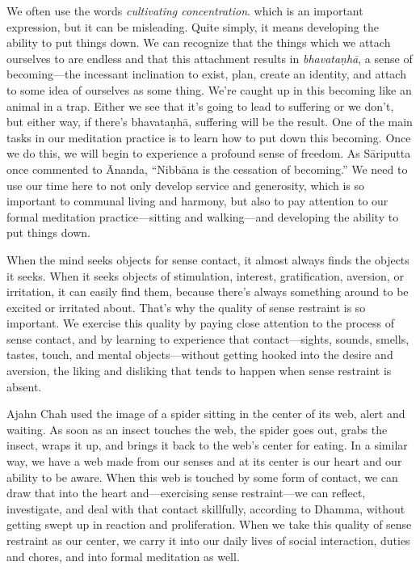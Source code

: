 We often use the words \emph{cultivating concentration}. which is an 
important expression, but it can be misleading. Quite simply, it means 
developing the ability to put things down. We can recognize that the 
things which we attach ourselves to are endless and that this 
attachment results in \emph{bhavataṇhā}, a sense of becoming---the 
incessant inclination to exist, plan, create an identity, and attach to 
some idea of ourselves as some thing. We're caught up in this becoming 
like an animal in a trap. Either we see that it's going to lead to 
suffering or we don't, but either way, if there's bhavataṇhā, 
suffering will be the result. One of the main tasks in our meditation 
practice is to learn how to put down this becoming. Once we do this, we 
will begin to experience a profound sense of freedom. As Sāriputta 
once commented to Ānanda, ``Nibbāna is the cessation of becoming.'' 
We need to use our time here to not only develop service and 
generosity, which is so important to communal living and harmony, but 
also to pay attention to our formal meditation practice---sitting and 
walking---and developing the ability to put things down.


When the mind seeks objects for sense contact, it almost always finds 
the objects it seeks. When it seeks objects of stimulation, interest, 
gratification, aversion, or irritation, it can easily find them, 
because there's always something around to be excited or irritated 
about. That's why the quality of sense restraint is so important. We 
exercise this quality by paying close attention to the process of sense 
contact, and by learning to experience that contact---sights, sounds, 
smells, tastes, touch, and mental objects---without getting hooked into 
the desire and aversion, the liking and disliking that tends to happen 
when sense restraint is absent.

Ajahn Chah used the image of a spider sitting in the center of its web, 
alert and waiting. As soon as an insect touches the web, the spider 
goes out, grabs the insect, wraps it up, and brings it back to the 
web's center for eating. In a similar way, we have a web made from our 
senses and at its center is our heart and our ability to be aware. When 
this web is touched by some form of contact, we can draw that into the 
heart and---exercising sense restraint---we can reflect, investigate, 
and deal with that contact skillfully, according to Dhamma, without 
getting swept up in reaction and proliferation. When we take this 
quality of sense restraint as our center, we carry it into our daily 
lives of social interaction, duties and chores, and into formal 
meditation as well.

